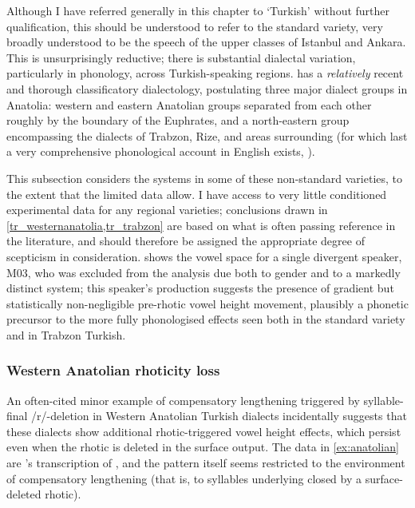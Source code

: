 Although I have referred generally in this chapter to `Turkish' without further qualification, this should be understood to refer to the standard variety, very broadly \citep{Lewis1967} understood to be the speech of the upper classes of Istanbul and Ankara. This is unsurprisingly reductive; there is substantial dialectal variation, particularly in phonology, across Turkish-speaking regions. \citet{Karahan1996} has a \emph{relatively} recent and thorough classificatory dialectology, postulating three major dialect groups in Anatolia: western and eastern Anatolian groups separated from each other roughly by the boundary of the Euphrates, and a north-eastern group encompassing the dialects of Trabzon, Rize, and areas surrounding (for which last a very comprehensive phonological account in English exists, \citealt{Brendemoen2002}).

This subsection considers the systems in some of these non-standard varieties, to the extent that the limited data allow. I have access to very little conditioned experimental data for any regional varieties; conclusions drawn in \cref{tr_westernanatolia,tr_trabzon} are based on what is often passing reference in the literature, and should therefore be assigned the appropriate degree of scepticism in consideration.  shows the vowel space for a single divergent speaker, M03, who was excluded from the analysis due both to gender and to a markedly distinct system; this speaker's production suggests the presence of gradient but statistically non-negligible pre-rhotic vowel height movement, plausibly a phonetic precursor to the more fully phonologised effects seen both in the standard variety and in Trabzon Turkish.

\subsubsection{Western Anatolian rhoticity loss}\label{tr_westernanatolia}

An often-cited minor example of compensatory lengthening triggered by syllable-final /r/-deletion \citep{Sezer1986,Kavitskaya2002} in Western Anatolian Turkish dialects incidentally suggests that these dialects show additional rhotic-triggered vowel height effects, which persist even when the rhotic is deleted in the surface output. The data in \cref{ex:anatolian} are \citeauthor{Sezer1986}'s transcription of \citet{Korkmaz1965}, and the pattern itself seems restricted to the environment of compensatory lengthening (that is, to syllables underlying closed by a surface-deleted rhotic).

